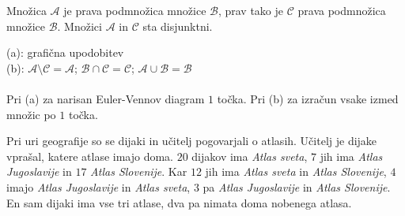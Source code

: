 \documentclass[addpoints]{exam}
\begin{document}
\begin{questions}
    \newpage
    \question
    Množica $\mathcal{A}$ je prava podmnožica množice $\mathcal{B}$, prav tako je $\mathcal{C}$ prava podmnožica množice $\mathcal{B}$. Množici $\mathcal{A}$ in $\mathcal{C}$ sta disjunktni.

    \begin{solution}[6cm]
        (a): grafična upodobitev \\
        (b): $\mathcal{A}\setminus\mathcal{C}=\mathcal{A}$; $\mathcal{B}\cap\mathcal{C}=\mathcal{C}$; $\mathcal{A}\cup\mathcal{B}=\mathcal{B}$ \\ \\
        Pri (a) za narisan Euler-Vennov diagram $1$ točka. Pri (b) za izračun vsake izmed množic po $1$ točka.
    \end{solution}






    
    \question
    Pri uri geografije so se dijaki in učitelj pogovarjali o atlasih.  Učitelj je dijake vprašal, katere atlase imajo doma.
    $20$ dijakov ima \textit{Atlas sveta}, $7$ jih ima \textit{Atlas Jugoslavije} in $17$ \textit{Atlas Slovenije}. Kar $12$ jih ima \textit{Atlas sveta} in \textit{Atlas Slovenije}, $4$ imajo \textit{Atlas Jugoslavije} in \textit{Atlas sveta},
    $3$ pa \textit{Atlas Jugoslavije} in \textit{Atlas Slovenije}. En sam dijaki ima vse tri atlase, dva pa nimata doma nobenega atlasa. 
\end{questions}
\end{document}
